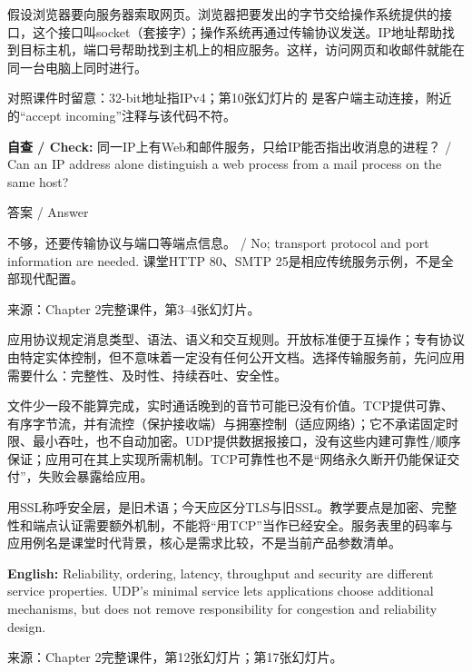假设浏览器要向服务器索取网页。浏览器把要发出的字节交给操作系统提供的接口，这个接口叫socket（套接字）；操作系统再通过传输协议发送。IP地址帮助找到目标主机，端口号帮助找到主机上的相应服务。这样，访问网页和收邮件就能在同一台电脑上同时进行。


对照课件时留意：32-bit地址指IPv4；第10张幻灯片的  是客户端主动连接，附近的“accept incoming”注释与该代码不符。


\textbf{自查 / Check:} 同一IP上有Web和邮件服务，只给IP能否指出收消息的进程？ / Can an IP address alone distinguish a web process from a mail process on the same host?



\begin{StudySolution}{答案 / Answer}


不够，还要传输协议与端口等端点信息。 / No; transport protocol and port information are needed. 课堂HTTP 80、SMTP 25是相应传统服务示例，不是全部现代配置。


\end{StudySolution}


来源：Chapter 2完整课件，第3–4张幻灯片。





应用协议规定消息类型、语法、语义和交互规则。开放标准便于互操作；专有协议由特定实体控制，但不意味着一定没有任何公开文档。选择传输服务前，先问应用需要什么：完整性、及时性、持续吞吐、安全性。


文件少一段不能算完成，实时通话晚到的音节可能已没有价值。TCP提供可靠、有序字节流，并有流控（保护接收端）与拥塞控制（适应网络）；它不承诺固定时限、最小吞吐，也不自动加密。UDP提供数据报接口，没有这些内建可靠性/顺序保证；应用可在其上实现所需机制。TCP可靠性也不是“网络永久断开仍能保证交付”，失败会暴露给应用。


用SSL称呼安全层，是旧术语；今天应区分TLS与旧SSL。教学要点是加密、完整性和端点认证需要额外机制，不能将“用TCP”当作已经安全。服务表里的码率与应用例名是课堂时代背景，核心是需求比较，不是当前产品参数清单。


\textbf{English:} Reliability, ordering, latency, throughput and security are different service properties. UDP's minimal service lets applications choose additional mechanisms, but does not remove responsibility for congestion and reliability design.


来源：Chapter 2完整课件，第12张幻灯片；第17张幻灯片。






